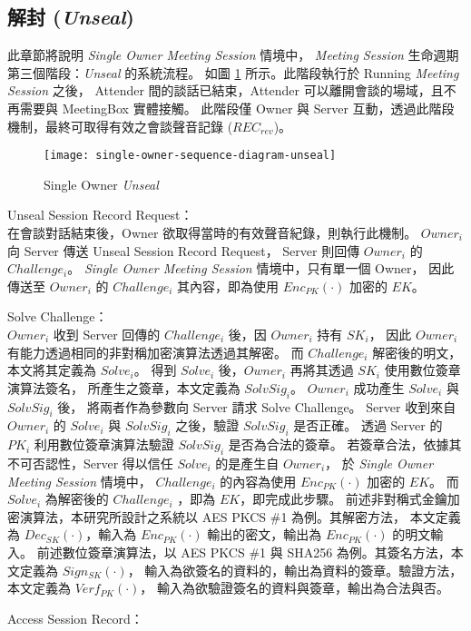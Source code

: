 \subsection{解封 ({\it Unseal})}

    此章節將說明 {\it Single Owner Meeting Session} 情境中，
{\it Meeting Session} 生命週期第三個階段：{\it Unseal} 的系統流程。
如圖 \ref{fig.s-o-unseal} 所示。此階段執行於 Running {\it Meeting Session} 之後，
Attender 間的談話已結束，Attender 可以離開會談的場域，且不再需要與 MeetingBox 實體接觸。
此階段僅 Owner 與 Server 互動，透過此階段機制，最終可取得有效之會談聲音記錄 ($REC_{rev}$)。

\begin{figure}[H]
    \centering
    \texttt{[image: single-owner-sequence-diagram-unseal]}
    \caption{Single Owner {\it Unseal}}
    \label{fig.s-o-unseal}
\end{figure}

\begin{steps}
    \item Unseal Session Record Request：\\
        在會談對話結束後，Owner 欲取得當時的有效聲音紀錄，則執行此機制。
        $Owner_{i}$ 向 Server 傳送 Unseal Session Record Request，
        Server 則回傳 $Owner_{i}$ 的 $Challenge_{i}$。
        {\it Single Owner Meeting Session} 情境中，只有單一個 Owner，
        因此傳送至 $Owner_{i}$ 的 $Challenge_{i}$ 其內容，即為使用 $Enc_{PK}(·)$ 加密的 $EK$。

    \item Solve Challenge：\\
        $Owner_{i}$ 收到 Server 回傳的 $Challenge_{i}$ 後，因 $Owner_{i}$ 持有 $SK_{i}$，
        因此 $Owner_{i}$ 有能力透過相同的非對稱加密演算法透過其解密。
        而 $Challenge_{i}$ 解密後的明文，本文將其定義為 $Solve_{i}$。
        得到 $Solve_{i}$ 後，$Owner_{i}$ 再將其透過 $SK_{i}$ 使用數位簽章演算法簽名，
        所產生之簽章，本文定義為 $SolvSig_{i}$。
        $Owner_{i}$ 成功產生 $Solve_{i}$ 與 $SolvSig_{i}$ 後，
        將兩者作為參數向 Server 請求 Solve Challenge。
        Server 收到來自$Owner_{i}$ 的 $Solve_{i}$ 與 $SolvSig_{i}$ 之後，驗證 $SolvSig_{i}$ 是否正確。
        透過 Server 的 $PK_{i}$ 利用數位簽章演算法驗證 $SolvSig_{i}$ 是否為合法的簽章。
        若簽章合法，依據其不可否認性，Server 得以信任 $Solve_{i}$ 的是產生自 $Owner_{i}$，
        於 {\it Single Owner Meeting Session} 情境中，
        $Challenge_{i}$ 的內容為使用 $Enc_{PK}(·)$ 加密的 $EK$。
        而 $Solve_{i}$ 為解密後的 $Challenge_{i}$ ，即為 $EK$，即完成此步驟。
        前述非對稱式金鑰加密演算法，本研究所設計之系統以 AES PKCS \#1 為例。其解密方法，
        本文定義為 $Dec_{SK}(·)$，輸入為 $Enc_{PK}(·)$ 輸出的密文，輸出為 $Enc_{PK}(·)$ 的明文輸入。
        前述數位簽章演算法，以 AES PKCS \#1 與 SHA256 為例。其簽名方法，本文定義為 $Sign_{SK}(·)$，
        輸入為欲簽名的資料的，輸出為資料的簽章。驗證方法，本文定義為 $Verf_{PK}(·)$，
        輸入為欲驗證簽名的資料與簽章，輸出為合法與否。

    \item Access Session Record：\\

\end{steps}


